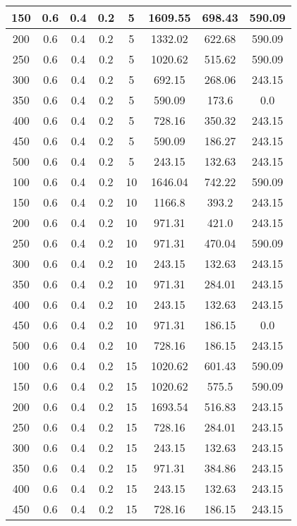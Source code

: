 \documentclass[a4paper, 12pt]{extreport}
\begin{document}
\begin{itemize}
\begin{longtable}{|c|c|c|c|c|c|c|c|}
			150 & 0.6 & 0.4 & 0.2 & 5 & 1609.55 & 698.43 & 590.09 \\\hline
			200 & 0.6 & 0.4 & 0.2 & 5 & 1332.02 & 622.68 & 590.09 \\\hline
			250 & 0.6 & 0.4 & 0.2 & 5 & 1020.62 & 515.62 & 590.09 \\\hline
			300 & 0.6 & 0.4 & 0.2 & 5 & 692.15 & 268.06 & 243.15 \\\hline
			350 & 0.6 & 0.4 & 0.2 & 5 & 590.09 & 173.6 & 0.0 \\\hline
			400 & 0.6 & 0.4 & 0.2 & 5 & 728.16 & 350.32 & 243.15 \\\hline
			450 & 0.6 & 0.4 & 0.2 & 5 & 590.09 & 186.27 & 243.15 \\\hline
			500 & 0.6 & 0.4 & 0.2 & 5 & 243.15 & 132.63 & 243.15 \\\hline
			100 & 0.6 & 0.4 & 0.2 & 10 & 1646.04 & 742.22 & 590.09 \\\hline
			150 & 0.6 & 0.4 & 0.2 & 10 & 1166.8 & 393.2 & 243.15 \\\hline
			200 & 0.6 & 0.4 & 0.2 & 10 & 971.31 & 421.0 & 243.15 \\\hline
			250 & 0.6 & 0.4 & 0.2 & 10 & 971.31 & 470.04 & 590.09 \\\hline
			300 & 0.6 & 0.4 & 0.2 & 10 & 243.15 & 132.63 & 243.15 \\\hline
			350 & 0.6 & 0.4 & 0.2 & 10 & 971.31 & 284.01 & 243.15 \\\hline
			400 & 0.6 & 0.4 & 0.2 & 10 & 243.15 & 132.63 & 243.15 \\\hline
			450 & 0.6 & 0.4 & 0.2 & 10 & 971.31 & 186.15 & 0.0 \\\hline
			500 & 0.6 & 0.4 & 0.2 & 10 & 728.16 & 186.15 & 243.15 \\\hline
			100 & 0.6 & 0.4 & 0.2 & 15 & 1020.62 & 601.43 & 590.09 \\\hline
			150 & 0.6 & 0.4 & 0.2 & 15 & 1020.62 & 575.5 & 590.09 \\\hline
			200 & 0.6 & 0.4 & 0.2 & 15 & 1693.54 & 516.83 & 243.15 \\\hline
			250 & 0.6 & 0.4 & 0.2 & 15 & 728.16 & 284.01 & 243.15 \\\hline
			300 & 0.6 & 0.4 & 0.2 & 15 & 243.15 & 132.63 & 243.15 \\\hline
			350 & 0.6 & 0.4 & 0.2 & 15 & 971.31 & 384.86 & 243.15 \\\hline
			400 & 0.6 & 0.4 & 0.2 & 15 & 243.15 & 132.63 & 243.15 \\\hline
			450 & 0.6 & 0.4 & 0.2 & 15 & 728.16 & 186.15 & 243.15 \\\hline

\end{longtable}
\end{itemize}
\end{document}
